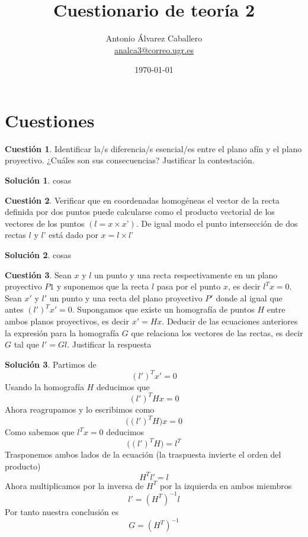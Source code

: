 \documentclass[a4paper, 11pt]{article}
\title{Cuestionario de teoría 2}
\author{Antonio Álvarez Caballero\\
    \href{mailto:analca3@correo.ugr.es}{analca3@correo.ugr.es}}
\date{\today}
\theoremstyle{definition}
\newtheorem{cuestion}{Cuestión}
\newtheorem*{solucion}{Solución}
\begin{document}
  \maketitle

  \section{Cuestiones}

  \begin{cuestion}
    Identificar la/s diferencia/s esencial/es entre el plano afín y el plano
    proyectivo. ¿Cuáles son sus consecuencias? Justificar la contestación.

  \end{cuestion}

  \begin{solucion}
    cosas
  \end{solucion}

  \begin{cuestion}
    Verificar que en coordenadas homogéneas el vector de la recta definida por
    dos puntos puede calcularse como el producto vectorial de los vectores de los
    puntos $(l = x \times x’)$. De igual modo el punto intersección de dos rectas $l$ y
    $l’$ está dado por $x = l \times l’$

  \end{cuestion}

  \begin{solucion}
      cosas
  \end{solucion}

  \begin{cuestion}
    Sean $x$ y $l$ un punto y una recta respectivamente en un plano proyectivo $P1$
    y suponemos que la recta $l$ pasa por el punto $x$, es decir $l^Tx=0$. Sean $x'$ y $l'$
    un punto y una recta del plano proyectivo $P'$ donde al igual que antes $(l')^T x'=0$.
    Supongamos que existe un homografía de puntos $H$ entre ambos planos proyectivos,
    es decir $x'=Hx$. Deducir de las ecuaciones anteriores la expresión para la
    homografía $G$ que relaciona los vectores de las rectas, es decir $G$ tal que $l'=Gl$.
    Justificar la respuesta

  \end{cuestion}

  \begin{solucion}
      Partimos de
      $$(l')^T x' = 0$$
      Usando la homografía $H$ deducimos que
      $$(l')^T Hx = 0$$
      Ahora reagrupamos y lo escribimos como
      $$\big((l')^T H\big)x = 0$$
      Como sabemos que $l^T x = 0$  deducimos
      $$\big((l')^T H\big) = l^T$$
      Trasponemos ambos lados de la ecuación (la traspuesta invierte el orden del producto)
      $$H^T l' = l$$
      Ahora multiplicamos por la inversa de $H^T$ por la izquierda en ambos miembros
      $$l' = (H^T)^{-1} l$$
      Por tanto nuestra conclusión es
      $$G = (H^T)^{-1}$$
  \end{solucion}
\end{document}
